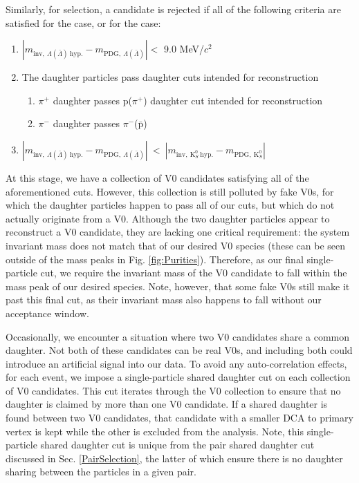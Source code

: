 \documentclass[/home/jesse/Analysis/FemtoAnalysis/AnalysisNotes/AnalysisNoteJBuxton.tex]{subfiles}
\begin{document}
Similarly, for \Ks selection, a candidate is rejected if all of the following criteria are satisfied for the \Lam case, or for the \ALam case:

\begin{enumerate}
 \item $\left|m_{\mathrm{inv}, \ \Lambda(\bar{\Lambda}) \ \mathrm{hyp.}} - m_{\mathrm{PDG},\ \Lambda(\bar{\Lambda})}\right| < $ 9.0 MeV/$c^{2}$
 \item The daughter particles pass daughter cuts intended for \LamALam reconstruction
 \begin{enumerate}
  \item $\pi^{+}$ daughter passes p($\pi^{+}$) daughter cut intended for \LamALam reconstruction
  \item $\pi^{-}$ daughter passes $\pi^{-}$($\bar{\mathrm{p}}$)
 \end{enumerate}
 \item $\left|m_{\mathrm{inv}, \ \Lambda(\bar{\Lambda}) \ \mathrm{hyp.}} - m_{\mathrm{PDG},\ \Lambda(\bar{\Lambda})}\right|~ < ~\left|m_{\mathrm{inv},~ \mathrm{K}^{0}_{S}~ \mathrm{hyp.}} - m_{\mathrm{PDG},~ \mathrm{K}^{0}_{S}}\right|$
\end{enumerate} 

At this stage, we have a collection of V0 candidates satisfying all of the aforementioned cuts.
However, this collection is still polluted by fake V0s, for which the daughter particles happen to pass all of our cuts, but which do not actually originate from a V0.
Although the two daughter particles appear to reconstruct a V0 candidate, they are lacking one critical requirement: the system invariant mass does not match that of our desired V0 species (these can be seen outside of the mass peaks in Fig. \ref{fig:Purities}).
Therefore, as our final single-particle cut, we require the invariant mass of the V0 candidate to fall within the mass peak of our desired species.
Note, however, that some fake V0s still make it past this final cut, as their invariant mass also happens to fall without our acceptance window.


Occasionally, we encounter a situation where two V0 candidates share a common daughter.
Not both of these candidates can be real V0s, and including both could introduce an artificial signal into our data.
To avoid any auto-correlation effects, for each event, we impose a single-particle shared daughter cut on each collection of V0 candidates.
This cut iterates through the V0 collection to ensure that no daughter is claimed by more than one V0 candidate.
If a shared daughter is found between two V0 candidates, that candidate with a smaller DCA to primary vertex is kept while the other is excluded from the analysis.
Note, this single-particle shared daughter cut is unique from the pair shared daughter cut discussed in Sec. \ref{PairSelection}, the latter of which ensure there is no daughter sharing between the particles in a given pair.
\end{document}
